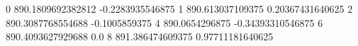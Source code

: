 0 890.1809692382812 -0.2283935546875
1 890.613037109375 0.20367431640625
2 890.3087768554688 -0.1005859375
4 890.0654296875 -0.34393310546875
6 890.4093627929688 0.0
8 891.386474609375 0.97711181640625
